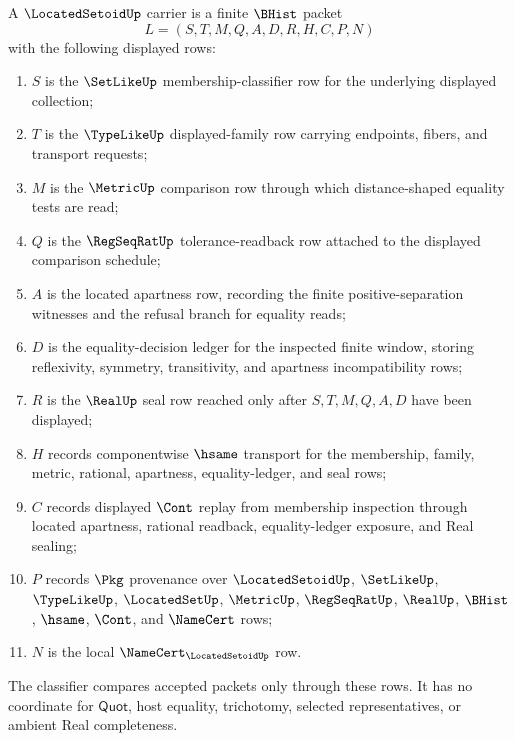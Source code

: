 \begin{definition}
\label{def:located-setoid-carrier}
A $\LocatedSetoidUp$ carrier is a finite $\BHist$ packet
$$
L=(S,T,M,Q,A,D,R,H,C,P,N)
$$
with the following displayed rows:
\begin{enumerate}
\item $S$ is the $\SetLikeUp$ membership-classifier row for the underlying displayed collection;
\item $T$ is the $\TypeLikeUp$ displayed-family row carrying endpoints, fibers, and transport requests;
\item $M$ is the $\MetricUp$ comparison row through which distance-shaped equality tests are read;
\item $Q$ is the $\RegSeqRatUp$ tolerance-readback row attached to the displayed comparison schedule;
\item $A$ is the located apartness row, recording the finite positive-separation witnesses and the refusal branch for equality reads;
\item $D$ is the equality-decision ledger for the inspected finite window, storing reflexivity, symmetry, transitivity, and apartness incompatibility rows;
\item $R$ is the $\RealUp$ seal row reached only after $S,T,M,Q,A,D$ have been displayed;
\item $H$ records componentwise $\hsame$ transport for the membership, family, metric, rational, apartness, equality-ledger, and seal rows;
\item $C$ records displayed $\Cont$ replay from membership inspection through located apartness, rational readback, equality-ledger exposure, and Real sealing;
\item $P$ records $\Pkg$ provenance over $\LocatedSetoidUp$, $\SetLikeUp$, $\TypeLikeUp$, $\LocatedSetUp$, $\MetricUp$, $\RegSeqRatUp$, $\RealUp$, $\BHist$, $\hsame$, $\Cont$, and $\NameCert$ rows;
\item $N$ is the local $\NameCert_{\LocatedSetoidUp}$ row.
\end{enumerate}
The classifier compares accepted packets only through these rows. It has no coordinate for $\mathsf{Quot}$, host equality, trichotomy, selected representatives, or ambient Real completeness.
\end{definition}

